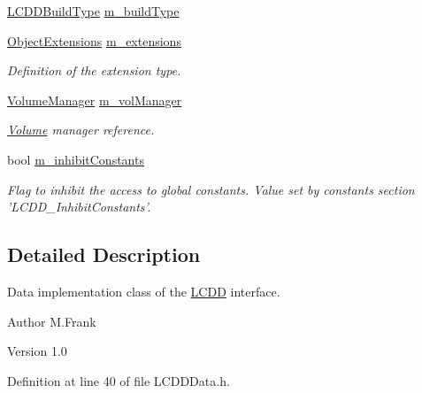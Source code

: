 \begin{DoxyCompactItemize}
\item 
\hyperlink{namespace_d_d4hep_acafe43ba4537ab6e999e808142965fab}{LCDDBuildType} \hyperlink{class_d_d4hep_1_1_geometry_1_1_l_c_d_d_data_aac00f4e1c495c5fb7a80037be3acb19e}{m\_\-buildType}
\item 
\hyperlink{class_d_d4hep_1_1_object_extensions}{ObjectExtensions} \hyperlink{class_d_d4hep_1_1_geometry_1_1_l_c_d_d_data_a686aca104b9460a62e5a89d8abbd3b7c}{m\_\-extensions}
\begin{DoxyCompactList}\small\item\em Definition of the extension type. \item\end{DoxyCompactList}\item 
\hyperlink{class_d_d4hep_1_1_geometry_1_1_volume_manager}{VolumeManager} \hyperlink{class_d_d4hep_1_1_geometry_1_1_l_c_d_d_data_a8a01d0ac487c537e9826d2900c95062a}{m\_\-volManager}
\begin{DoxyCompactList}\small\item\em \hyperlink{class_d_d4hep_1_1_geometry_1_1_volume}{Volume} manager reference. \item\end{DoxyCompactList}\item 
bool \hyperlink{class_d_d4hep_1_1_geometry_1_1_l_c_d_d_data_a81f222787e773b64fd9c8898f5e0aa9b}{m\_\-inhibitConstants}
\begin{DoxyCompactList}\small\item\em Flag to inhibit the access to global constants. Value set by constants section 'LCDD\_\-InhibitConstants'. \item\end{DoxyCompactList}\end{DoxyCompactItemize}


\subsection{Detailed Description}
Data implementation class of the \hyperlink{class_d_d4hep_1_1_geometry_1_1_l_c_d_d}{LCDD} interface. \begin{DoxyAuthor}{Author}
M.Frank 
\end{DoxyAuthor}
\begin{DoxyVersion}{Version}
1.0 
\end{DoxyVersion}


Definition at line 40 of file LCDDData.h.

